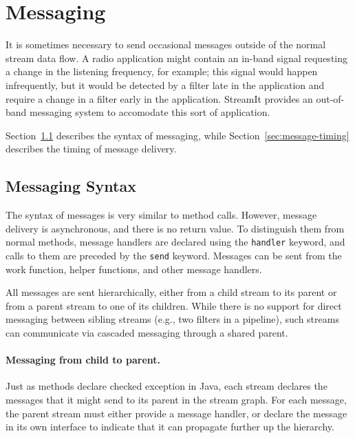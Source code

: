 \newcommand{\sdep}[0]{\textsc{sdep}}
\newcommand{\sdepf}[2]{\sdep_{#1 \small{\leftarrow} #2}}

\section{Messaging}
\label{sec:messaging}

It is sometimes necessary to send occasional messages outside of the
normal stream data flow.  A radio application might contain an in-band
signal requesting a change in the listening frequency, for example;
this signal would happen infrequently, but it would be detected by a
filter late in the application and require a change in a filter early
in the application.  StreamIt provides an out-of-band messaging system
to accomodate this sort of application.

Section~\ref{sec:message-syntax} describes the syntax of messaging,
while Section~\ref{sec:message-timing} describes the timing of message
delivery.

\subsection{Messaging Syntax}
\label{sec:message-syntax}

The syntax of messages is very similar to method calls.  However,
message delivery is asynchronous, and there is no return value.  To
distinguish them from normal methods, message handlers are declared
using the \lstinline|handler| keyword, and calls to them are preceded
by the \lstinline|send| keyword.  Messages can be sent from the work
function, helper functions, and other message handlers.

All messages are sent hierarchically, either from a child stream to
its parent or from a parent stream to one of its children.  While
there is no support for direct messaging between sibling streams
(e.g., two filters in a pipeline), such streams can communicate via
cascaded messaging through a shared parent.

\paragraph{Messaging from child to parent.} Just as methods declare 
checked exception in Java, each stream declares the messages that it
might send to its parent in the stream graph.  For each message, the
parent stream must either provide a message handler, or declare the
message in its own interface to indicate that it can propagate further
up the hierarchy.

